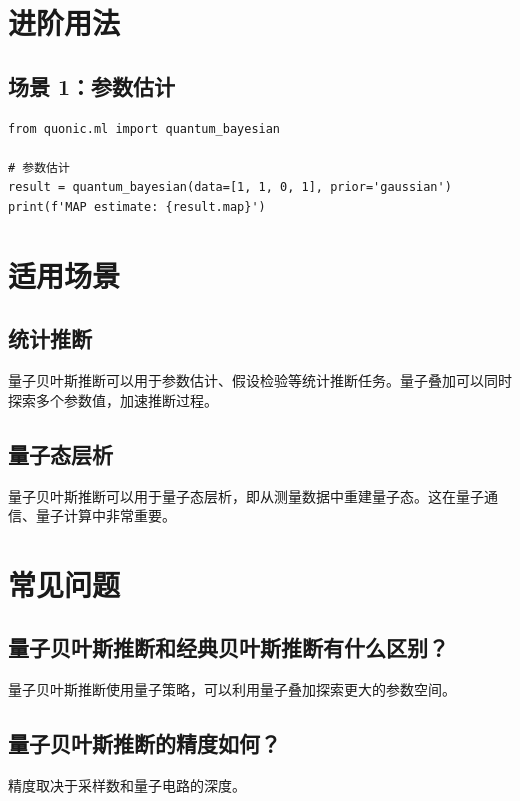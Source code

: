 \documentclass[12pt,a4paper]{article}
\begin{document}
\section{进阶用法}

\subsection{场景 1：参数估计}

\begin{verbatim}
from quonic.ml import quantum_bayesian

# 参数估计
result = quantum_bayesian(data=[1, 1, 0, 1], prior='gaussian')
print(f'MAP estimate: {result.map}')
\end{verbatim}

\section{适用场景}

\subsection{统计推断}

量子贝叶斯推断可以用于参数估计、假设检验等统计推断任务。量子叠加可以同时探索多个参数值，加速推断过程。

\subsection{量子态层析}

量子贝叶斯推断可以用于量子态层析，即从测量数据中重建量子态。这在量子通信、量子计算中非常重要。

\section{常见问题}

\subsection{量子贝叶斯推断和经典贝叶斯推断有什么区别？}

量子贝叶斯推断使用量子策略，可以利用量子叠加探索更大的参数空间。

\subsection{量子贝叶斯推断的精度如何？}

精度取决于采样数和量子电路的深度。
\end{document}
